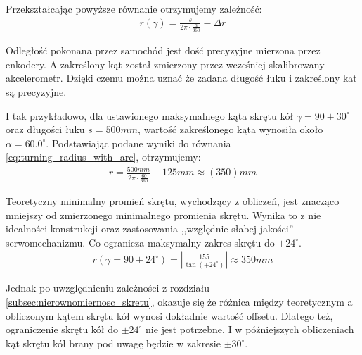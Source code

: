             Przekształcając powyższe równanie otrzymujemy zależność:
            \begin{gather}
                r(\gamma) = \frac{s}{2\pi \cdot \frac{\alpha}{360}} - \Delta r
                \label{eq:turning_radius_with_arc}
            \end{gather}

            Odległość pokonana przez samochód jest dość precyzyjne mierzona przez enkodery.
            A zakreślony kąt został zmierzony przez wcześniej skalibrowany akcelerometr.
            Dzięki czemu można uznać że zadana długość łuku i zakreślony kat są precyzyjne.

            I tak przykładowo, dla ustawionego maksymalnego kąta skrętu kół $\gamma = 90 + 30^\circ$ oraz długości łuku $s = 500mm$, wartość zakreślonego kąta wynosiła około $\alpha = 60.0^\circ$.
            Podstawiając podane wyniki do równania \eqref{eq:turning_radius_with_arc}, otrzymujemy:
            \begin{gather}
                r = \frac{500mm}{2\pi \cdot \frac{60}{360}} - 125mm \approx (350)mm
            \end{gather}


            Teoretyczny minimalny promień skrętu, wychodzący z obliczeń, jest znacząco mniejszy od zmierzonego minimalnego promienia skrętu.
            Wynika to z nie idealności konstrukcji oraz zastosowania ,,względnie słabej jakości'' serwomechanizmu.
            Co ogranicza maksymalny zakres skrętu do $\pm 24^\circ$.
            \begin{gather}
                r(\gamma = 90 + 24^\circ) = \left|\frac{155}{\tan(+ 24^\circ)}\right| \approx 350mm
            \end{gather}

            Jednak po uwzględnieniu zależności z rozdziału \ref{subsec:nierownomiernosc_skretu}, okazuje się że różnica między teoretycznym a obliczonym kątem skrętu kół wynosi dokładnie wartość offsetu.
            Dlatego też, ograniczenie skrętu kół do $\pm 24^\circ$ nie jest potrzebne. I w późniejszych obliczeniach kąt skrętu kół brany pod uwagę będzie w zakresie $\pm 30^\circ$.


